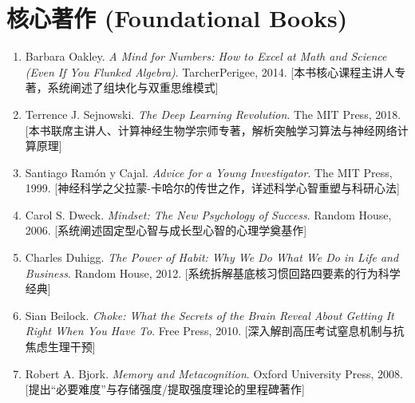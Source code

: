 \documentclass[12pt,a4paper,openany]{ctexbook}
\begin{document}
\section*{核心著作 (Foundational Books)}
\begin{enumerate}
    \item Barbara Oakley. \emph{A Mind for Numbers: How to Excel at Math and Science (Even If You Flunked Algebra)}. TarcherPerigee, 2014. [本书核心课程主讲人专著，系统阐述了组块化与双重思维模式]
    \item Terrence J. Sejnowski. \emph{The Deep Learning Revolution}. The MIT Press, 2018. [本书联席主讲人、计算神经生物学宗师专著，解析突触学习算法与神经网络计算原理]
    \item Santiago Ramón y Cajal. \emph{Advice for a Young Investigator}. The MIT Press, 1999. [神经科学之父拉蒙-卡哈尔的传世之作，详述科学心智重塑与科研心法]
    \item Carol S. Dweck. \emph{Mindset: The New Psychology of Success}. Random House, 2006. [系统阐述固定型心智与成长型心智的心理学奠基作]
    \item Charles Duhigg. \emph{The Power of Habit: Why We Do What We Do in Life and Business}. Random House, 2012. [系统拆解基底核习惯回路四要素的行为科学经典]
    \item Sian Beilock. \emph{Choke: What the Secrets of the Brain Reveal About Getting It Right When You Have To}. Free Press, 2010. [深入解剖高压考试窒息机制与抗焦虑生理干预]
    \item Robert A. Bjork. \emph{Memory and Metacognition}. Oxford University Press, 2008. [提出“必要难度”与存储强度/提取强度理论的里程碑著作]
\end{enumerate}
\end{document}
